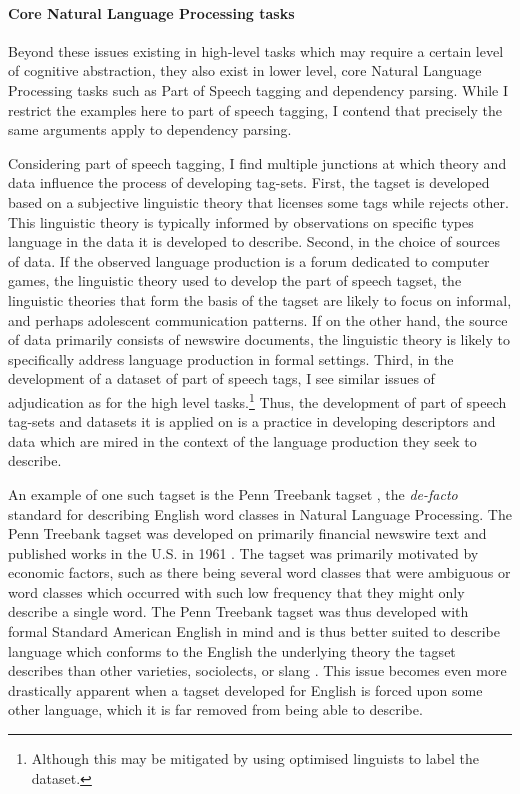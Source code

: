 \paragraph{Core Natural Language Processing tasks}
Beyond these issues existing in high-level tasks which may require a certain level of cognitive abstraction, they also exist in lower level, core Natural Language Processing tasks such as Part of Speech tagging and dependency parsing. While I restrict the examples here to part of speech tagging, I contend that precisely the same arguments apply to dependency parsing.

Considering part of speech tagging, I find multiple junctions at which theory and data influence the process of developing tag-sets. First, the tagset is developed based on a subjective linguistic theory that licenses some tags while rejects other. This linguistic theory is typically informed by observations on specific types language in the data it is developed to describe. Second, in the choice of sources of data. If the observed language production is a forum dedicated to computer games, the linguistic theory used to develop the part of speech tagset, the linguistic theories that form the basis of the tagset are likely to focus on informal, and perhaps adolescent communication patterns. If on the other hand, the source of data primarily consists of newswire documents, the linguistic theory is likely to specifically address language production in formal settings. Third, in the development of a dataset of part of speech tags, I see similar issues of adjudication as for the high level tasks.\footnote{Although this may be mitigated by using optimised linguists to label the dataset.}
Thus, the development of part of speech tag-sets and datasets it is applied on is a practice in developing descriptors and data which are mired in the context of the language production they seek to describe.

An example of one such tagset is the Penn Treebank tagset \citep{Marcus:1993}, the \textit{de-facto} standard for describing English word classes in Natural Language Processing. The Penn Treebank tagset was developed on primarily financial newswire text and published works in the U.S. in 1961 \citep{Francis:1982}. The tagset was primarily motivated by economic factors, such as there being several word classes that were ambiguous or word classes which occurred with such low frequency that they might only describe a single word. The Penn Treebank tagset was thus developed with formal Standard American English in mind and is thus better suited to describe language which conforms to the English the underlying theory the tagset describes than other varieties, sociolects, or slang \citep{Blodgett:2016,Jorgensen:2016}.
This issue becomes even more drastically apparent when a tagset developed for English is forced upon some other language, which it is far removed from being able to describe.

